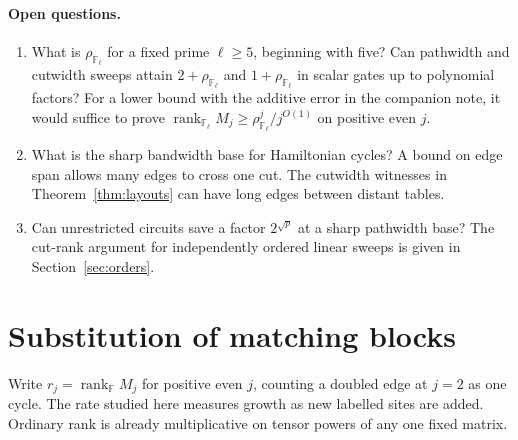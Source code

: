 \documentclass[11pt]{article}
\theoremstyle{definition}
\newcommand{\F}{\mathbb F}
\newcommand{\rank}{\operatorname{rank}}
\begin{document}
\paragraph{Open questions.}
\begin{enumerate}[leftmargin=*,label=\textnormal{(\arabic*)}]

\item What is \(\rho_{\mathbb F_\ell}\) for a fixed prime \(\ell\ge5\), beginning with five? Can pathwidth and cutwidth sweeps attain \(2+\rho_{\mathbb F_\ell}\) and \(1+\rho_{\mathbb F_\ell}\) in scalar gates up to polynomial factors? For a lower bound with the additive error in the companion note, it would suffice to prove \(\rank_{\mathbb F_\ell} M_j\ge \rho_{\mathbb F_\ell}^j/j^{O(1)}\) on positive even \(j\).
\item What is the sharp bandwidth base for Hamiltonian cycles? A bound on edge span allows many edges to cross one cut. The cutwidth witnesses in Theorem~\ref{thm:layouts} can have long edges between distant tables.

\item Can unrestricted circuits save a factor \(2^{\sqrt p}\) at a sharp pathwidth base? The cut-rank argument for independently ordered linear sweeps is given in Section~\ref{sec:orders}.

\end{enumerate}

\section{Substitution of matching blocks}\label{sec:rank-rate}

Write \(r_j=\rank_\F M_j\) for positive even \(j\), counting a doubled edge at \(j=2\) as one cycle. The rate studied here measures growth as new labelled sites are added. Ordinary rank is already multiplicative on tensor powers of any one fixed matrix.
\end{document}
